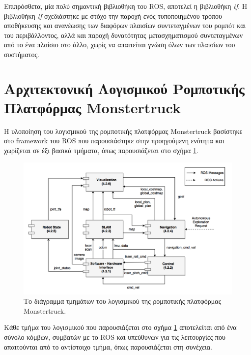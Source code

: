 \bigskip
Επιπρόσθετα, μία πολύ σημαντική βιβλιοθήκη του ROS, αποτελεί η βιβλιοθήκη \textit{tf}. Η βιβλιοθήκη \textit{tf} σχεδιάστηκε με στόχο την παροχή ενός τυποποιημένου τρόπου αποθήκευσης και ανανέωσης των διαφόρων πλαισίων συντεταγμένων του ρομπότ και του περιβάλλοντος, αλλά και παροχή δυνατότητας μετασχηματισμού συντεταγμένων από το ένα πλαίσιο στο άλλο, χωρίς να απαιτείται γνώση όλων των πλαισίων του συστήματος.

\section{Αρχιτεκτονική Λογισμικού Ρομποτικής Πλατφόρμας Monstertruck} \label{sec:software}
Η υλοποίηση του λογισμικού της ρομποτικής πλατφόρμας Monstertruck βασίστηκε στο framework του ROS που παρουσιάστηκε στην προηγούμενη ενότητα και χωρίζεται σε έξι βασικά τμήματα, όπως παρουσιάζεται στο σχήμα \ref{fig:component_diagram}.

\begin{figure}[!ht]
	\centering
	\includegraphics[width=\linewidth]{Chapters/Chapter4/Figures/component_diagram.png}
	\caption{Το διάγραμμα τμημάτων του λογισμικού της ρομποτικής πλατφόρμας Monstertruck.}
	\label{fig:component_diagram}
\end{figure}

\bigskip
Κάθε τμήμα του λογισμικού που παρουσιάζεται στο σχήμα \ref{fig:component_diagram} αποτελείται από ένα σύνολο κόμβων, συμβατών με το ROS και υπεύθυνων για τις λειτουργίες που απαιτούνται από το αντίστοιχο τμήμα, όπως παρουσιάζεται στη συνέχεια.


